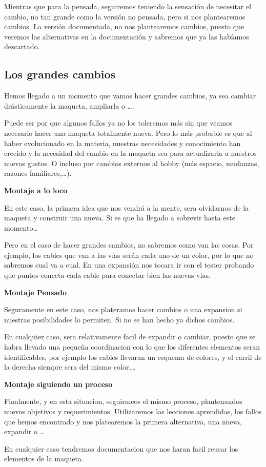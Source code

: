 Mientras que para la pensada, seguiremos teniendo la sensación de necesitar el cambio, no tan grande como la versión no pensada, pero si nos plantearemos cambios. La versión documentada, no nos plantearemos cambios, puesto que veremos las alternativas en la documentación y sabremos que ya las habíamos descartado.



\subsection{Los grandes cambios}
Hemos llegado a un momento que vamos hacer grandes cambios, ya sea cambiar drásticamente la maqueta, ampliarla o \dots.

Puede ser por que algunos fallos ya no los toleremos más sin que veamos necesario hacer una maqueta totalmente nueva. Pero lo más probable es que al haber evolucionado en la materia, nuestras necesidades y conocimiento han crecido y la necesidad del cambio en la maqueta sea para actualizarla a nuestros nuevos gustos. O incluso por cambios externos al hobby (más espacio, mudanzas, razones familiares,\dots). 



\begin{multicols}{3}
	\textbf{Montaje a lo loco}
	
	En este caso, la primera idea que nos vendrá a la mente, sera olvidarnos de la maqueta y construir una nueva. Si es que ha llegado a sobrevir hasta este momento\dots
	
	Pero en el caso de hacer grandes cambios, no sabremos como van las cosas. Por ejemplo, los cables que van a las vías serán cada uno de un color, por lo que no sabremos cual va a cual. En una expansión nos tocara ir con el tester probando que puntos conecta cada cable para conectar bien las nuevas vías.
	
	\columnbreak
	
	\textbf{Montaje Pensado}
	
	Seguramente en este caso, nos plateramos hacer cambios o una expansion si nuestras posibilidades lo permiten. Si no se han hecho ya dichos cambios.
	
	En cualquier caso, sera relativamente facil de expandir o cambiar, puesto que se habra llevado una pequeña coordinacion con lo que los diferentes elementos seran identificables, por ejemplo los cables llevaran un esquema de colores, y el carril de la derecha siempre sera del mismo color,\dots
	
	\columnbreak
	
	\textbf{Montaje siguiendo un proceso}
	
	Finalmente, y en esta situacion, seguirmeos el mismo proceso, plantenandos nuevos objetivos y requerimientos. Utilizaremos las lecciones aprendidas, los fallos que hemos encontrado y nos platearemos la primera alternativa, una nueva, expandir o \dots
	
	En cualquier caso tendremos documentacion que nos haran facil reusar los elementos de la maqueta.
\end{multicols}

